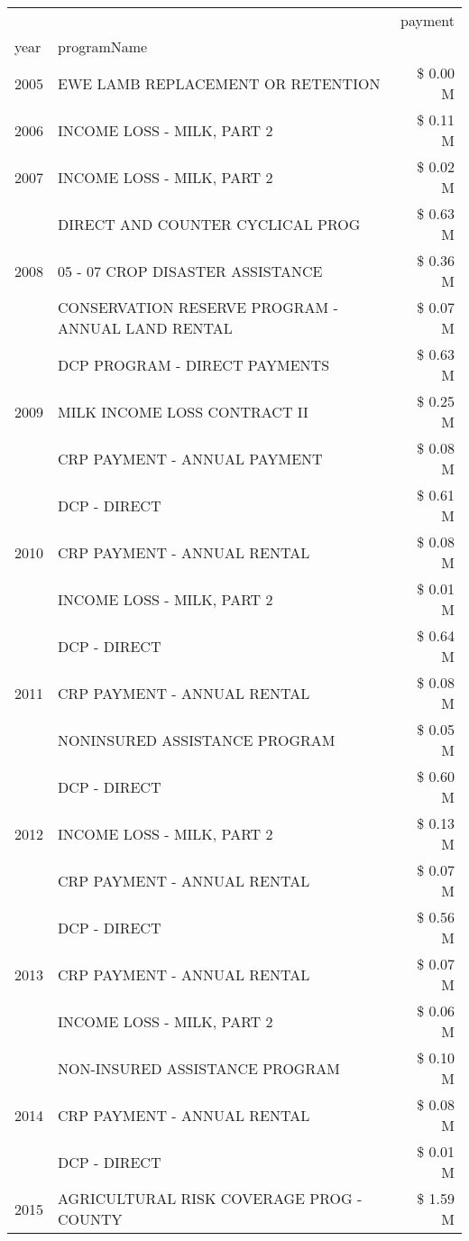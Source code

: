 \begin{tabular}{llr}
\toprule
 &  & payment \\
year & programName &  \\
\midrule
2005 & EWE LAMB REPLACEMENT OR RETENTION & \$ 0.00 M \\
\cline{1-3}
2006 & INCOME LOSS - MILK, PART 2 & \$ 0.11 M \\
\cline{1-3}
2007 & INCOME LOSS - MILK, PART 2 & \$ 0.02 M \\
\cline{1-3}
\multirow[t]{3}{*}{2008} & DIRECT AND COUNTER CYCLICAL PROG & \$ 0.63 M \\
 & 05 - 07 CROP DISASTER ASSISTANCE & \$ 0.36 M \\
 & CONSERVATION RESERVE PROGRAM - ANNUAL LAND RENTAL & \$ 0.07 M \\
\cline{1-3}
\multirow[t]{3}{*}{2009} & DCP PROGRAM - DIRECT PAYMENTS & \$ 0.63 M \\
 & MILK INCOME LOSS CONTRACT II & \$ 0.25 M \\
 & CRP PAYMENT - ANNUAL PAYMENT & \$ 0.08 M \\
\cline{1-3}
\multirow[t]{3}{*}{2010} & DCP - DIRECT & \$ 0.61 M \\
 & CRP PAYMENT - ANNUAL RENTAL & \$ 0.08 M \\
 & INCOME LOSS - MILK, PART 2 & \$ 0.01 M \\
\cline{1-3}
\multirow[t]{3}{*}{2011} & DCP - DIRECT & \$ 0.64 M \\
 & CRP PAYMENT - ANNUAL RENTAL & \$ 0.08 M \\
 & NONINSURED ASSISTANCE PROGRAM & \$ 0.05 M \\
\cline{1-3}
\multirow[t]{3}{*}{2012} & DCP - DIRECT & \$ 0.60 M \\
 & INCOME LOSS - MILK, PART 2 & \$ 0.13 M \\
 & CRP PAYMENT - ANNUAL RENTAL & \$ 0.07 M \\
\cline{1-3}
\multirow[t]{3}{*}{2013} & DCP - DIRECT & \$ 0.56 M \\
 & CRP PAYMENT - ANNUAL RENTAL & \$ 0.07 M \\
 & INCOME LOSS - MILK, PART 2 & \$ 0.06 M \\
\cline{1-3}
\multirow[t]{3}{*}{2014} & NON-INSURED ASSISTANCE PROGRAM & \$ 0.10 M \\
 & CRP PAYMENT - ANNUAL RENTAL & \$ 0.08 M \\
 & DCP - DIRECT & \$ 0.01 M \\
\cline{1-3}
\multirow[t]{3}{*}{2015} & AGRICULTURAL RISK COVERAGE PROG - COUNTY & \$ 1.59 M \\

\end{tabular}
